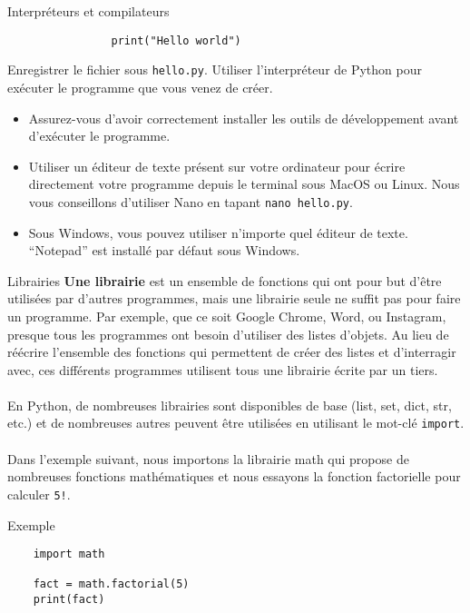 \begin{section}{Interpréteurs et compilateurs}
\begin{Exercice}[10 minutes]
\begin{lstlisting}
                print("Hello world")\end{lstlisting}
        Enregistrer le fichier sous \lstinline{hello.py}. Utiliser l'interpréteur de Python pour exécuter le programme que vous venez de créer.
    \end{Exercice}
    \begin{conseil}
        \begin{itemize}
            \item Assurez-vous d'avoir correctement installer les outils de développement avant d'exécuter le programme.
            \item Utiliser un éditeur de texte présent sur votre ordinateur pour écrire directement votre programme depuis le terminal sous MacOS ou Linux. Nous vous conseillons d'utiliser Nano en tapant \lstinline{nano hello.py}.
            \item Sous Windows, vous pouvez utiliser n'importe quel éditeur de texte. ``Notepad'' est installé par défaut sous Windows.
        \end{itemize}
    \end{conseil}    

\end{section}

\begin{section}{Librairies}
    \textbf{Une librairie} est un ensemble de fonctions qui ont pour but d'être utilisées par d'autres programmes, mais une librairie seule ne suffit pas pour faire un programme. Par exemple, que ce soit Google Chrome, Word, ou Instagram, presque tous les programmes ont besoin d'utiliser des listes d'objets. Au lieu de réécrire l'ensemble des fonctions qui permettent de créer des listes et d'interragir avec, ces différents programmes utilisent tous une librairie écrite par un tiers.
\\\\
En Python, de nombreuses librairies sont disponibles de base (list, set, dict, str, etc.) et de nombreuses autres peuvent être utilisées en utilisant le mot-clé \lstinline{import}.
\\\\
Dans l'exemple suivant, nous importons la librairie math qui propose de nombreuses fonctions mathématiques et nous essayons la fonction factorielle pour calculer \lstinline{5!}.
\begin{Example}{\faTerminal Exemple}
    \begin{lstlisting}
    import math

    fact = math.factorial(5)
    print(fact)\end{lstlisting}
\end{Example}
    
\end{section}




